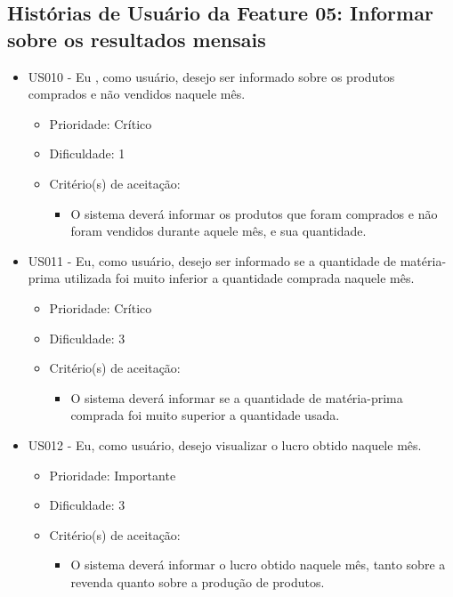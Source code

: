 \subsection{Histórias de Usuário da Feature 05: Informar sobre os resultados mensais}

\begin{itemize}


\item US010 - Eu , como usuário, desejo ser informado sobre os produtos comprados e não vendidos naquele mês.
    \begin{itemize}
    \item Prioridade: Crítico
    \item Dificuldade: 1
		  \item Critério(s) de aceitação:
			\begin{itemize}
				\item O sistema deverá informar os produtos que foram comprados e não foram vendidos durante aquele mês, e sua quantidade.
			\end{itemize}
    \end{itemize}

\item US011 - Eu, como usuário, desejo ser informado se a quantidade de matéria-prima utilizada foi muito inferior a quantidade comprada naquele mês.
    \begin{itemize}
    \item Prioridade: Crítico
    \item Dificuldade: 3
		  \item Critério(s) de aceitação:
			\begin{itemize}
				\item O sistema deverá informar se a quantidade de matéria-prima comprada foi muito superior a quantidade usada.
			\end{itemize}
    \end{itemize}

		\item US012 - Eu, como usuário, desejo visualizar o lucro obtido naquele mês.
		\begin{itemize}
		\item Prioridade: Importante
		\item Dificuldade: 3
			\item Critério(s) de aceitação:
			\begin{itemize}
				\item O sistema deverá informar o lucro obtido naquele mês, tanto sobre a revenda quanto sobre a produção de produtos.
			\end{itemize}
		\end{itemize}


\end{itemize}


